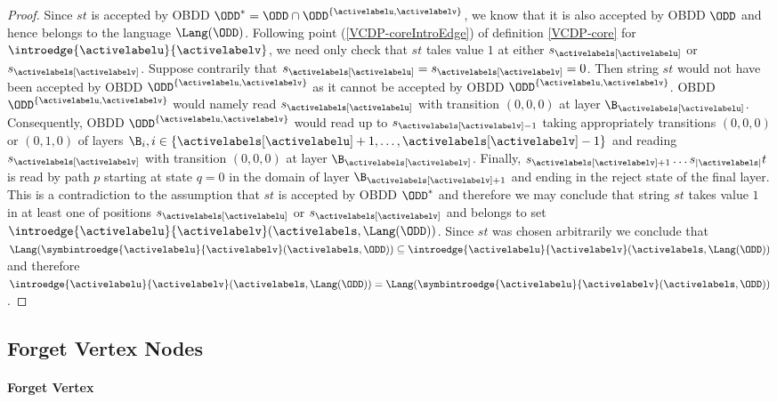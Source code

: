 \begin{proof}
    Since $st$ is accepted by OBDD $\ODD^* = \ODD \cap \ODD^{\{\activelabelu,\activelabelv\}}$, we know that it is also accepted by OBDD $\ODD$ and hence belongs to the language $\Lang(\ODD)$. Following point (\ref{VCDP-coreIntroEdge}) of  definition \ref{VCDP-core} for $\introedge{\activelabelu}{\activelabelv}$, we need only check that $st$ tales value $1$ at either $s_{\activelabels[\activelabelu]}$ or $s_{\activelabels[\activelabelv]}$. Suppose contrarily that $s_{\activelabels[\activelabelu]} = s_{\activelabels[\activelabelv]} = 0$. Then string $st$ would not have been accepted by OBDD $\ODD^{\{\activelabelu,\activelabelv\}}$ as it cannot be accepted by OBDD $\ODD^{\{\activelabelu,\activelabelv\}}$. OBDD $\ODD^{\{\activelabelu,\activelabelv\}}$ would namely read $s_{\activelabels[\activelabelu]}$ with transition $(0,0,0)$ at layer $\B_{\activelabels[\activelabelu]}$. Consequently, OBDD $\ODD^{\{\activelabelu,\activelabelv\}}$ would read up to $s_{\activelabels[\activelabelv] - 1}$ taking appropriately transitions $(0,0,0)$ or $(0,1,0)$ of layers $\B_i, i \in \{\activelabels[\activelabelu]+1,\ldots,\activelabels[\activelabelv]-1\}$ and reading $s_{\activelabels[\activelabelv]}$ with transition $(0,0,0)$ at layer $\B_{\activelabels[\activelabelv]}$. Finally, $s_{\activelabels[\activelabelv]+1}\dots s_{|\activelabels|}t$ is read by path $p$ starting at state $q=0$ in the domain of layer $\B_{\activelabels[\activelabelv]+1}$ and ending in the reject state of the final layer. This is a contradiction to the assumption that $st$ is accepted by OBDD $\ODD^*$ and therefore we may conclude that string $st$ takes value $1$ in at least one of positions $s_{\activelabels[\activelabelu]}$ or $s_{\activelabels[\activelabelv]}$ and belongs to set $\introedge{\activelabelu}{\activelabelv}(\activelabels,\Lang(\ODD))$. Since $st$ was chosen arbitrarily we conclude that $\Lang(\symbintroedge{\activelabelu}{\activelabelv}(\activelabels,\ODD)) \subseteq \introedge{\activelabelu}{\activelabelv}(\activelabels, \Lang(\ODD))$ and therefore $\introedge{\activelabelu}{\activelabelv}(\activelabels,\Lang(\ODD)) = \Lang(\symbintroedge{\activelabelu}{\activelabelv}(\activelabels,\ODD))$.
    
\end{proof}

\subsection{Forget Vertex Nodes} \label{subsec:FrgProof}

\paragraph*{Forget Vertex}


